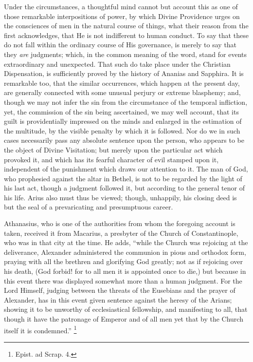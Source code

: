 Under the circumstances, a thoughtful mind cannot but account this
as one of those remarkable interpositions of power, by which Divine
Providence urges on the consciences of men in the natural course of
things, what their reason from the first acknowledges, that He is not
indifferent to human conduct. To say that these do not fall within the
ordinary course of His governance, is merely to say that they \emph{are}
judgments; which, in the common meaning of the word, stand for events
extraordinary and unexpected. That such do take place under the
Christian Dispensation, is sufficiently proved by the history of
Ananias and Sapphira. It is remarkable too, that the similar
occurrences, which happen at the present day, are generally connected
with some unusual perjury or extreme blasphemy; and, though we may not
infer the sin from the circumstance of the temporal infliction, yet,
the commission of the sin being ascertained, we may well account, that
its guilt is providentially impressed on the minds and enlarged
in the estimation of the multitude, by the visible penalty by which it
is followed. Nor do we in such cases necessarily pass any absolute
sentence upon the person, who appears to be the object of Divine
Visitation; but merely upon the particular act which provoked it, and
which has its fearful character of evil stamped upon it, independent
of the punishment which draws our attention to it. The man of God, who
prophesied against the altar in Bethel, is not to be regarded by the
light of his last act, though a judgment followed it, but according to
the general tenor of his life. Arius also must thus be viewed; though,
unhappily, his closing deed is but the seal of a prevaricating and
presumptuous career.

Athanasius, who is one of the authorities from whom the foregoing
account is taken, received it from Macarius, a presbyter of the Church
of Constantinople, who was in that city at the time. He adds,
``while the Church was rejoicing at the deliverance, Alexander
administered the communion in pious and orthodox form, praying with
all the brethren and glorifying God greatly; not as if rejoicing over
his death, (God forbid! for to all men it is appointed once to die,)
but because in this event there was displayed somewhat more than a
human judgment. For the Lord Himself, judging between the threats of
the Eusebians and the prayer of Alexander, has in this event given
sentence against the heresy of the Arians; showing it to be unworthy
of ecclesiastical fellowship, and manifesting to all, that though it
have the patronage of Emperor and of all men yet that by the Church
itself it is condemned.'' \footnote{Epist. ad Scrap. 4.}

